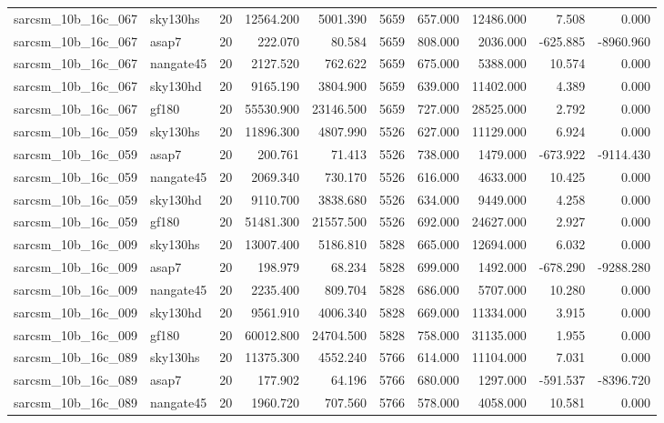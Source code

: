 \begin{longtable}{llrrrrrrrr}
sarcsm\_10b\_16c\_067 & sky130hs & 20 & 12564.200 & 5001.390 & 5659 & 657.000 & 12486.000 & 7.508 & 0.000 \\
sarcsm\_10b\_16c\_067 & asap7 & 20 & 222.070 & 80.584 & 5659 & 808.000 & 2036.000 & -625.885 & -8960.960 \\
sarcsm\_10b\_16c\_067 & nangate45 & 20 & 2127.520 & 762.622 & 5659 & 675.000 & 5388.000 & 10.574 & 0.000 \\
sarcsm\_10b\_16c\_067 & sky130hd & 20 & 9165.190 & 3804.900 & 5659 & 639.000 & 11402.000 & 4.389 & 0.000 \\
sarcsm\_10b\_16c\_067 & gf180 & 20 & 55530.900 & 23146.500 & 5659 & 727.000 & 28525.000 & 2.792 & 0.000 \\
sarcsm\_10b\_16c\_059 & sky130hs & 20 & 11896.300 & 4807.990 & 5526 & 627.000 & 11129.000 & 6.924 & 0.000 \\
sarcsm\_10b\_16c\_059 & asap7 & 20 & 200.761 & 71.413 & 5526 & 738.000 & 1479.000 & -673.922 & -9114.430 \\
sarcsm\_10b\_16c\_059 & nangate45 & 20 & 2069.340 & 730.170 & 5526 & 616.000 & 4633.000 & 10.425 & 0.000 \\
sarcsm\_10b\_16c\_059 & sky130hd & 20 & 9110.700 & 3838.680 & 5526 & 634.000 & 9449.000 & 4.258 & 0.000 \\
sarcsm\_10b\_16c\_059 & gf180 & 20 & 51481.300 & 21557.500 & 5526 & 692.000 & 24627.000 & 2.927 & 0.000 \\
sarcsm\_10b\_16c\_009 & sky130hs & 20 & 13007.400 & 5186.810 & 5828 & 665.000 & 12694.000 & 6.032 & 0.000 \\
sarcsm\_10b\_16c\_009 & asap7 & 20 & 198.979 & 68.234 & 5828 & 699.000 & 1492.000 & -678.290 & -9288.280 \\
sarcsm\_10b\_16c\_009 & nangate45 & 20 & 2235.400 & 809.704 & 5828 & 686.000 & 5707.000 & 10.280 & 0.000 \\
sarcsm\_10b\_16c\_009 & sky130hd & 20 & 9561.910 & 4006.340 & 5828 & 669.000 & 11334.000 & 3.915 & 0.000 \\
sarcsm\_10b\_16c\_009 & gf180 & 20 & 60012.800 & 24704.500 & 5828 & 758.000 & 31135.000 & 1.955 & 0.000 \\
sarcsm\_10b\_16c\_089 & sky130hs & 20 & 11375.300 & 4552.240 & 5766 & 614.000 & 11104.000 & 7.031 & 0.000 \\
sarcsm\_10b\_16c\_089 & asap7 & 20 & 177.902 & 64.196 & 5766 & 680.000 & 1297.000 & -591.537 & -8396.720 \\
sarcsm\_10b\_16c\_089 & nangate45 & 20 & 1960.720 & 707.560 & 5766 & 578.000 & 4058.000 & 10.581 & 0.000 \\

\end{longtable}
